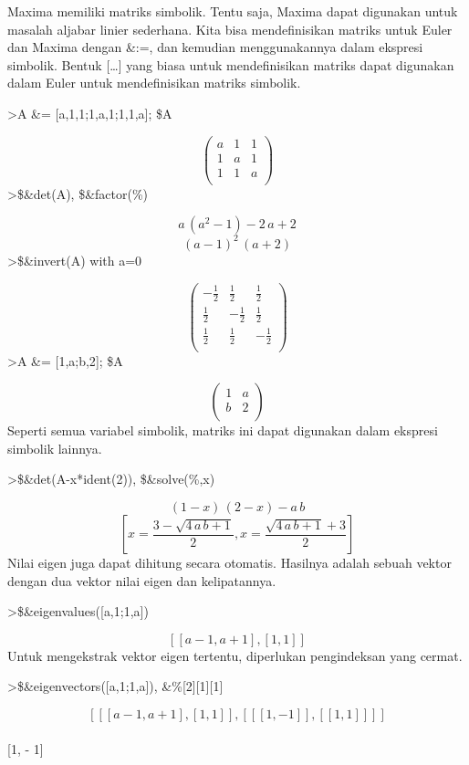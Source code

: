 \documentclass[
]{book}
\begin{document}
Maxima memiliki matriks simbolik. Tentu saja, Maxima dapat digunakan untuk masalah aljabar linier sederhana. Kita bisa mendefinisikan matriks untuk Euler dan Maxima dengan \&:=, dan kemudian menggunakannya dalam ekspresi simbolik. Bentuk {[}\ldots{]} yang biasa untuk mendefinisikan matriks dapat digunakan dalam Euler untuk mendefinisikan matriks simbolik.

\textgreater A \&= {[}a,1,1;1,a,1;1,1,a{]}; \$A

\[\begin{pmatrix}a & 1 & 1 \\ 1 & a & 1 \\ 1 & 1 & a \\ \end{pmatrix}\]\textgreater\$\&det(A), \$\&factor(\%)

\[a\,\left(a^2-1\right)-2\,a+2\]\[\left(a-1\right)^2\,\left(a+2\right)\]\textgreater\$\&invert(A) with a=0

\[\begin{pmatrix}-\frac{1}{2} & \frac{1}{2} & \frac{1}{2} \\ \frac{1
 }{2} & -\frac{1}{2} & \frac{1}{2} \\ \frac{1}{2} & \frac{1}{2} & -
 \frac{1}{2} \\ \end{pmatrix}\]\textgreater A \&= {[}1,a;b,2{]}; \$A

\[\begin{pmatrix}1 & a \\ b & 2 \\ \end{pmatrix}\]Seperti semua variabel simbolik, matriks ini dapat digunakan dalam ekspresi simbolik lainnya.

\textgreater\$\&det(A-x*ident(2)), \$\&solve(\%,x)

\[\left(1-x\right)\,\left(2-x\right)-a\,b\]\[\left[ x=\frac{3-\sqrt{4\,a\,b+1}}{2} , x=\frac{\sqrt{4\,a\,b+1}+3
 }{2} \right] \]Nilai eigen juga dapat dihitung secara otomatis. Hasilnya adalah sebuah vektor dengan dua vektor nilai eigen dan kelipatannya.

\textgreater\$\&eigenvalues({[}a,1;1,a{]})

\[\left[ \left[ a-1 , a+1 \right]  , \left[ 1 , 1 \right]  \right] \]Untuk mengekstrak vektor eigen tertentu, diperlukan pengindeksan yang cermat.

\textgreater\$\&eigenvectors({[}a,1;1,a{]}), \&\%{[}2{]}{[}1{]}{[}1{]}

\[\left[ \left[ \left[ a-1 , a+1 \right]  , \left[ 1 , 1 \right] 
  \right]  , \left[ \left[ \left[ 1 , -1 \right]  \right]  , \left[ 
 \left[ 1 , 1 \right]  \right]  \right]  \right] \]\\
{[}1, - 1{]}
\end{document}
